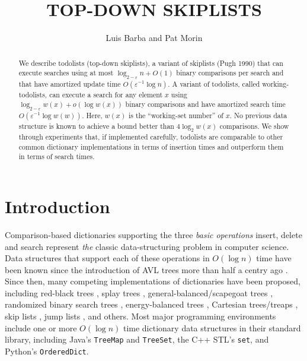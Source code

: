 \documentclass{patmorin}
\title{\MakeUppercase{Top-Down Skiplists}}
\author{Luis Barba and Pat Morin}
\newcommand{\eps}{\varepsilon}
\begin{document}
\begin{titlepage}
\maketitle

\begin{abstract}
  We describe todolists (top-down skiplists), a variant of skiplists
  (Pugh 1990) that can execute searches using at most $\log_{2-\eps} n +
  O(1)$ binary comparisons per search and that have amortized update time
  $O(\eps^{-1}\log n)$. A variant of todolists, called working-todolists,
  can execute a search for any element $x$ using $\log_{2-\eps} w(x)
  + o(\log w(x))$ binary comparisons and have amortized search time
  $O(\eps^{-1}\log w(w))$. Here, $w(x)$ is the ``working-set number'' of
  $x$. No previous data structure is known to achieve a bound better
  than $4\log_2 w(x)$ comparisons. We show through experiments that,
  if implemented carefully, todolists are comparable to other common
  dictionary implementations in terms of insertion times and outperform
  them in terms of search times.
\end{abstract}

\end{titlepage}

\section{Introduction}

Comparison-based dictionaries supporting the three \emph{basic
operations} insert, delete and search represent \emph{the} classic
data-structuring problem in computer science.  Data structures that
support each of these operations in $O(\log n)$ time have been known
since the introduction of AVL trees more than half a centry ago
\cite{adelson-velskii.landis:algorithm}.  Since then, many competing
implementations of dictionaries have been proposed, including
red-black trees \cite{guibas.sedgewick:dichromatic}, splay trees
\cite{sleator.tarjan:self-adjusting}, general-balanced/scapegoat
trees \cite{andersson:general,galperin.rivest:scapegoat},
randomized binary search trees \cite{martinez:randomized},
energy-balanced trees \cite{goodrich:competitive}, Cartesian trees/treaps
\cite{aragon.seidel:randomized,vuillemin:unifying}, skip lists
\cite{pugh:skip}, jump lists \cite{bronnimann.cazals.ea:randomized},
and others.  Most major programming environments include one or more
$O(\log n)$ time dictionary data structures in their standard library,
including Java's \texttt{TreeMap} and \texttt{TreeSet}, the C++ STL's
\texttt{set}, and Python's \texttt{OrderedDict}.
\end{document}

